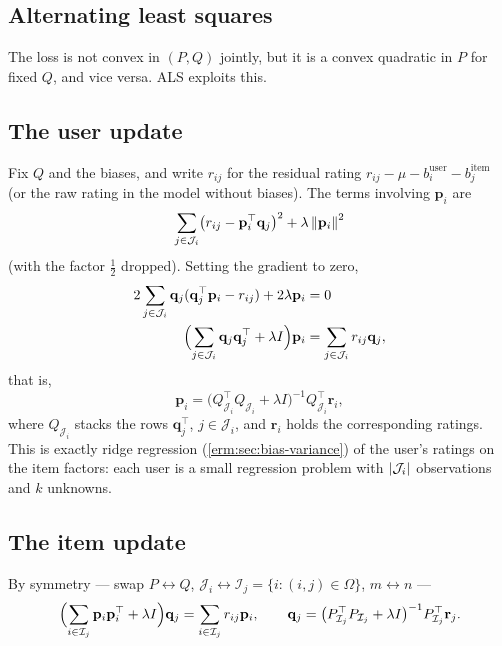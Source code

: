 \begin{notechapter}
\section{Alternating least squares}\label{matrix-factorization:sec:als}

The loss is not convex in $(P,Q)$ jointly, but it is a convex quadratic in $P$ for fixed $Q$,
and vice versa. ALS exploits this.

\subsection{The user update}

Fix $Q$ and the biases, and write $r_{ij}$ for the residual rating
$r_{ij} - \mu - b_i^{\text{user}} - b_j^{\text{item}}$ (or the raw rating in the model without biases). The
terms involving $\mathbf p_i$ are
\[
  \sum_{j\in\mathcal J_i}\bigl(r_{ij} - \mathbf p_i^\top\mathbf q_j\bigr)^2 + \lambda\left\|\mathbf p_i\right\|^2
\]
(with the factor $\frac12$ dropped). Setting the gradient to zero,
\begin{align*}
  2\sum_{j\in\mathcal J_i}\mathbf q_j(\mathbf q_j^\top\mathbf p_i - r_{ij}) + 2\lambda\mathbf p_i &= 0\\
  \Bigl(\sum_{j\in\mathcal J_i}\mathbf q_j\mathbf q_j^\top + \lambda I\Bigr)\mathbf p_i &= \sum_{j\in\mathcal J_i}r_{ij}\mathbf q_j,
\end{align*}
that is,
\[
  \mathbf p_i = \bigl(Q_{\mathcal J_i}^\top Q_{\mathcal J_i} + \lambda I\bigr)^{-1}Q_{\mathcal J_i}^\top\mathbf r_i,
\]
where $Q_{\mathcal J_i}$ stacks the rows $\mathbf q_j^\top$, $j\in\mathcal J_i$, and $\mathbf r_i$ holds the corresponding ratings.
This is exactly ridge regression (\cref{erm:sec:bias-variance}) of the user's ratings on the
item factors: each user is a small regression problem with $\left|\mathcal J_i\right|$ observations and $k$
unknowns.

\subsection{The item update}

By symmetry --- swap $P\leftrightarrow Q$, $\mathcal J_i\leftrightarrow\mathcal I_j = \{i : (i,j)\in\Omega\}$, $m\leftrightarrow n$ ---
\[
  \Bigl(\sum_{i\in\mathcal I_j}\mathbf p_i\mathbf p_i^\top + \lambda I\Bigr)\mathbf q_j = \sum_{i\in\mathcal I_j}r_{ij}\mathbf p_i,
  \qquad
  \mathbf q_j = \bigl(P_{\mathcal I_j}^\top P_{\mathcal I_j} + \lambda I\bigr)^{-1}P_{\mathcal I_j}^\top\mathbf r_j .
\]


\end{notechapter}

